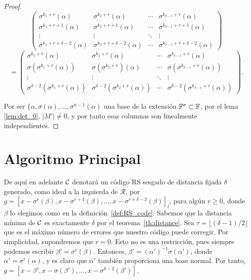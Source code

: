 \begin{proof}
\[
\begin{pmatrix}
    \sigma^{k_1+r}(\alpha) & \sigma^{k_2+r}(\alpha) & \cdots & \sigma^{k_{\delta-1}+r}(\alpha) \\
    \sigma^{k_1+r+1}(\alpha) & \sigma^{k_2+r+1}(\alpha) & \cdots & \sigma^{k_{\delta-1}+r+1}(\alpha) \\
    \vdots & \vdots & \ddots & \vdots \\
    \sigma^{k_1+r+\delta-2}(\alpha) & \sigma^{k_2+r+\delta-2}(\alpha) & \cdots & \sigma^{k_{\delta-1}+r+\delta-2}(\alpha)
\end{pmatrix}
\]
\[
=
\begin{pmatrix}
    \sigma^{k_1+r}(\alpha) & \sigma^{k_2+r}(\alpha) & \cdots & \sigma^{k_{\delta-1}+r}(\alpha) \\
    \sigma(\sigma^{k_1+r}(\alpha)) & \sigma(\sigma^{k_2+r})(\alpha) & \cdots & \sigma(\sigma^{k_{\delta-1}+r}(\alpha)) \\
    \vdots & \vdots & \ddots & \vdots \\
    \sigma^{\delta-2}(\sigma^{k_1+r}(\alpha)) & \sigma^{\delta-2}(\sigma^{k_2+r}(\alpha)) & \cdots & \sigma^{\delta-2}(\sigma^{k_{\delta-1}+r}(\alpha))
\end{pmatrix}
.\]

Por ser \(\{\alpha, \sigma(\alpha), \dots, \sigma^{n-1}(\alpha)\) una base de la extensión \(\mathbb{F}^\sigma \subset \mathbb{F}\), por el lema \ref{lem:det_0}, \(|M'| \neq 0\), y por tanto esas columnas son linealmente independientes.
\end{proof}

\section{Algoritmo Principal}%
\label{sec:algoritmo_principal}

De aquí en adelante \(\mathcal{C}\) denotará un código RS sesgado de distancia fijada \(\delta\) generado, como ideal a la izquierda de  \(\mathcal{R}\), por  \(g = {[x - \sigma^r(\beta), x - \sigma^{r+1}(\beta), \dots, x - \sigma^{r+\delta - 2}(\beta)]}_l\), para algún \(r \geq 0 \), donde \(\beta\) lo elegimos como en la definición~\ref{def:RS_code}. Sabemos que la distancia mínima de \(\mathcal{C}\) es exactamente \(\delta\) por el teorema~\ref{th:distance}. Sea \(\tau = \lfloor (\delta -1)/2 \rfloor\) que es el máximo número de errores que nuestro código puede corregir. Por simplicidad, supondremos que \(r = 0\). Esto no es una restricción, pues siempre podemos escribir  \(\beta' = \sigma^r(\beta)\). Entonces, \(\beta' = {(\alpha')}^{-1} \sigma(\alpha')\), donde \(\alpha' = \sigma^r(\alpha)\), y es claro que \(\alpha'\) también proporciona una base normal. Por tanto, \(g = [x - \beta', x - \sigma(\beta'), \dots, x - \sigma^{\delta - 2}(\beta')]\).

